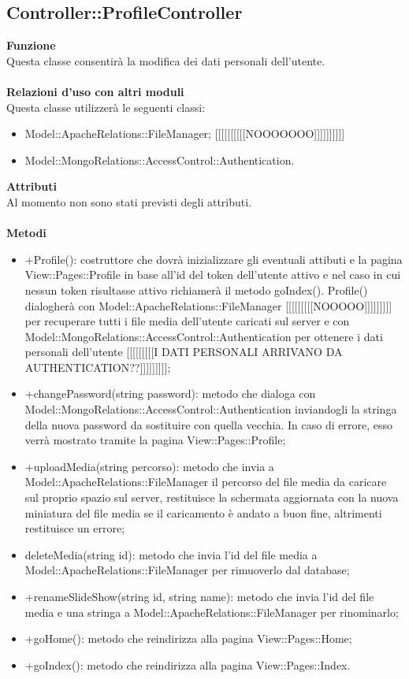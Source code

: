 {				\subsection{Controller::ProfileController}{
					\textbf{Funzione}\\
					\indent Questa classe consentirà la modifica dei dati personali dell'utente.\\\\
					\textbf{Relazioni d'uso con altri moduli}\\
					\indent Questa classe utilizzerà le seguenti classi:
					\begin{itemize}
						\item Model::ApacheRelations::FileManager; [[[[[[[[[[NOOOOOOO]]]]]]]]]]
						\item Model::MongoRelations::AccessControl::Authentication.
					\end{itemize}
					\textbf{Attributi}\\
					\indent Al momento non sono stati previsti degli attributi.\\\\
					\textbf{Metodi}
					\begin{itemize}
						\item +Profile(): costruttore che dovrà inizializzare gli eventuali attibuti e la pagina View::Pages::Profile in base all'id del token dell'utente attivo e nel caso in cui nessun token risultasse attivo richiamerà il metodo goIndex(). Profile() dialogherà con Model::ApacheRelations::FileManager [[[[[[[[[NOOOOO]]]]]]]]] per recuperare tutti i file media dell'utente caricati sul server e con Model::MongoRelations::AccessControl::Authentication per ottenere i dati personali dell'utente [[[[[[[[[I DATI PERSONALI ARRIVANO DA AUTHENTICATION??]]]]]]]]];
						\item +changePassword(string password): metodo che dialoga con Model::MongoRelations::AccessControl::Authentication inviandogli la stringa della nuova password da sostituire con quella vecchia. In caso di errore, esso verrà mostrato tramite la pagina View::Pages::Profile;
						\item +uploadMedia(string percorso): metodo che invia a Model::ApacheRelations::FileManager il percorso del file media da caricare sul proprio spazio sul server, restituisce la schermata aggiornata con la nuova miniatura del file media se il caricamento è andato a buon fine, altrimenti restituisce un errore;
						\item deleteMedia(string id): metodo che invia l'id del file media a Model::ApacheRelations::FileManager per rimuoverlo dal database;
						\item +renameSlideShow(string id, string name): metodo che invia l'id del file media e una stringa a Model::ApacheRelations::FileManager per rinominarlo;
						\item +goHome(): metodo che reindirizza alla pagina View::Pages::Home;
						\item +goIndex(): metodo che reindirizza alla pagina View::Pages::Index.
					\end{itemize}
				}
}
